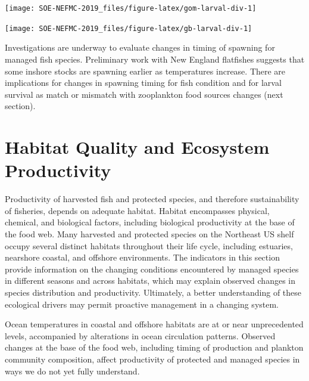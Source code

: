 \documentclass[10pt,]{article}
\let\origfigure\figure
\let\endorigfigure\endfigure
\renewenvironment{figure}[1][2] {
    \expandafter\origfigure\expandafter[H]
} {
    \endorigfigure
}
\begin{document}
\begin{figure}

{\centering \texttt{[image: SOE-NEFMC-2019\_files/figure-latex/gom-larval-div-1]} 

}

\caption{Larval diversity indices from ECOMON surveys in the Gulf of Maine.}\label{fig:gom-larval-div}
\end{figure}

\begin{figure}

{\centering \texttt{[image: SOE-NEFMC-2019\_files/figure-latex/gb-larval-div-1]} 

}

\caption{Larval diversity indices from ECOMON surveys on Georges Bank.}\label{fig:gb-larval-div}
\end{figure}

Investigations are underway to evaluate changes in timing of spawning
for managed fish species. Preliminary work with New England flatfishes
suggests that some inshore stocks are spawning earlier as temperatures
increase. There are implications for changes in spawning timing for fish
condition and for larval survival as match or mismatch with zooplankton
food sources changes (next section).

\newpage

\section{Habitat Quality and Ecosystem
Productivity}\label{habitat-quality-and-ecosystem-productivity}

Productivity of harvested fish and protected species, and therefore
sustainability of fisheries, depends on adequate habitat. Habitat
encompasses physical, chemical, and biological factors, including
biological productivity at the base of the food web. Many harvested and
protected species on the Northeast US shelf occupy several distinct
habitats throughout their life cycle, including estuaries, nearshore
coastal, and offshore environments. The indicators in this section
provide information on the changing conditions encountered by managed
species in different seasons and across habitats, which may explain
observed changes in species distribution and productivity. Ultimately, a
better understanding of these ecological drivers may permit proactive
management in a changing system.

Ocean temperatures in coastal and offshore habitats are at or near
unprecedented levels, accompanied by alterations in ocean circulation
patterns. Observed changes at the base of the food web, including timing
of production and plankton community composition, affect productivity of
protected and managed species in ways we do not yet fully understand.
\end{document}
